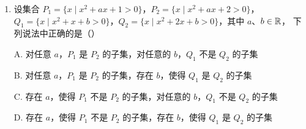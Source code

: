 \documentclass[a4paper,11pt]{article}
\begin{document}
\begin{enumerate}
\fi

\item 设集合 $P_1=\{x\mid x^2+ax+1>0\}$，$P_2=\{x\mid x^2+ax+2>0\}$，
$Q_1=\{x\mid x^2+x+b>0\}$，$Q_2=\{x\mid x^2+2x+b>0\}$，其中 $a$、$b\in\mathbb{R}$，
下列说法中正确的是\mbox{（\quad）}

\keepwithprev
A. 对任意 $a$，$P_1$ 是 $P_2$ 的子集，对任意的 $b$，$Q_1$ 不是 $Q_2$ 的子集

B. 对任意 $a$，$P_1$ 是 $P_2$ 的子集，存在 $b$，使得 $Q_1$ 是 $Q_2$ 的子集

C. 存在 $a$，使得 $P_1$ 不是 $P_2$ 的子集，对任意的 $b$，$Q_1$ 不是 $Q_2$ 的子集

D. 存在 $a$，使得 $P_1$ 不是 $P_2$ 的子集，存在 $b$，使得 $Q_1$ 是 $Q_2$ 的子集


\ifanswer
\solbegin
{}
\solend

\fi

\end{enumerate}

\end{document}

